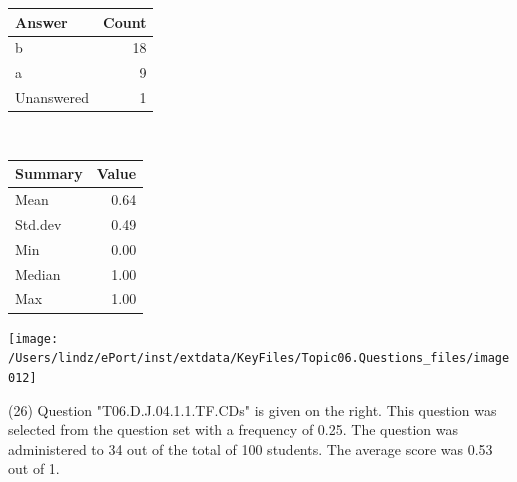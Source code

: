 \documentclass[12pt,nohyper]{tufte-handout}\usepackage[]{graphicx}\usepackage[]{color}
\begin{document}
\begin{center}%
\begin{tabular}{lr}
  \hline
Answer & Count \\ 
  \hline
b &  18 \\ 
  a &   9 \\ 
  Unanswered &   1 \\ 
   \hline
\end{tabular}
~~~~~~~~%
\begin{tabular}{lr}
  \hline
Summary & Value \\ 
  \hline
Mean & 0.64 \\ 
  Std.dev & 0.49 \\ 
  Min & 0.00 \\ 
  Median & 1.00 \\ 
  Max & 1.00 \\ 
   \hline
\end{tabular}
\end{center}\newpage{}



\vspace{7cm}\begin{marginfigure}\texttt{[image: /Users/lindz/ePort/inst/extdata/KeyFiles/Topic06.Questions\_files/image012]}\end{marginfigure}\vspace{-7cm} (26) Question "T06.D.J.04.1.1.TF.CDs" is given on the right. This question was selected from the question set with a frequency of 0.25. The question was administered to 34 out of the total of 100 students. The average score was 0.53 out of 1.
\end{document}
